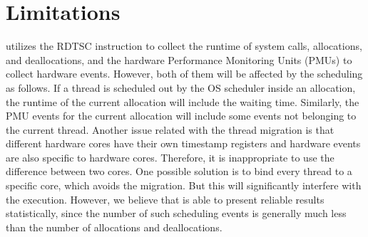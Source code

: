 \section{Limitations}

\label{sec:limitation}

\MP{} utilizes the RDTSC instruction to collect the runtime of system calls, allocations, and deallocations, and the hardware Performance Monitoring Units (PMUs) to collect hardware events. However, both of them will be affected by the scheduling as follows. If a thread is scheduled out by the OS scheduler inside an allocation, the runtime of the current allocation will include the waiting time. Similarly, the PMU events for the current allocation will  include some events not belonging to the current thread. Another issue related with the thread migration is that different hardware cores have their own timestamp registers and hardware events are also specific to hardware cores. Therefore, it is inappropriate to use the difference between two cores.  One possible solution is to bind every thread to a specific core, which avoids the migration. But this will significantly interfere with the execution. However, we believe that \MP{} is able to present reliable results statistically, since the number of such scheduling events is generally much less than the number of allocations and deallocations.   

